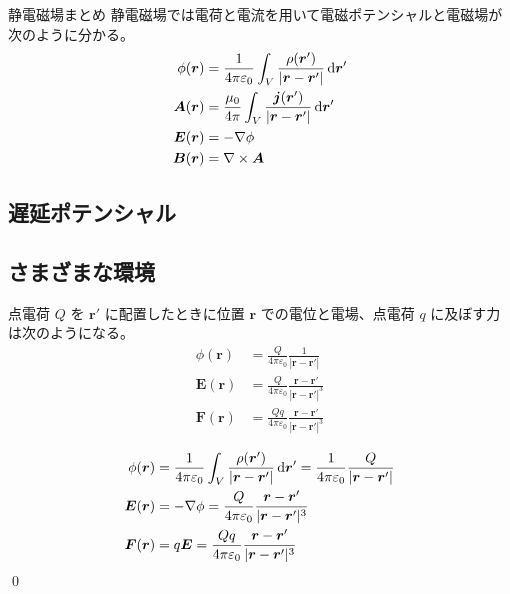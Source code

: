 \documentclass[uplatex,dvipdfmx,a4paper,11pt]{jlreq}
\makeatletter
\newcommand{\EE}{\bm{E}}
\newcommand{\BB}{\bm{B}}
\renewcommand{\AA}{\bm{A}}
\newcommand{\rr}{\bm{r}}
\newcommand{\vnabla}{\mathbf{\nabla}}
\numberwithin{equation}{section}
\theoremstyle{definition}
\renewenvironment{proof}[1][\proofname]{\par
  \normalfont
  \topsep6\p@\@plus6\p@ \trivlist
  \item[\hskip\labelsep{\bfseries #1}\@addpunct{\bfseries}]\ignorespaces\quad\par
}{%
  \qed\endtrivlist\@endpefalse
}
\renewcommand\proofname{証明}
\makeatother
\begin{document}
\begin{itembox}[l]{静電磁場まとめ}
  静電磁場では電荷と電流を用いて電磁ポテンシャルと電磁場が次のように分かる。
  \begin{align}
    \phi(\rr) & = \frac{1}{4\pi\varepsilon_0}\int_V\frac{\rho(\rr')}{|\rr - \rr'|}\dl{\rr'} \\
    \AA(\rr)  & = \frac{\mu_0}{4\pi}\int_V\frac{\bm{j}(\rr')}{|\rr - \rr'|}\dl{\rr'}        \\
    \EE(\rr)  & = -\vnabla\phi                                                              \\
    \BB(\rr)  & = \vnabla\times\AA
  \end{align}
\end{itembox}


\subsection{遅延ポテンシャル}


\subsection{さまざまな環境}
\begin{theorem}[Coulomb 力]
  点電荷 $Q$ を $\rr'$ に配置したときに位置 $\rr$ での電位と電場、点電荷 $q$ に及ぼす力は次のようになる。
  \begin{align}
    \phi(\rr)   & = \frac{Q}{4\pi\varepsilon_0}\frac{1}{|\rr - \rr'|}             \\
    \EE(\rr)    & = \frac{Q}{4\pi\varepsilon_0}\frac{\rr - \rr'}{|\rr - \rr'|^3}  \\
    \bm{F}(\rr) & = \frac{Qq}{4\pi\varepsilon_0}\frac{\rr - \rr'}{|\rr - \rr'|^3}
  \end{align}
\end{theorem}
\begin{proof}
  \begin{align}
    \phi(\rr)   & = \frac{1}{4\pi\varepsilon_0}\int_V\frac{\rho(\rr')}{|\rr - \rr'|}\dl{\rr'} = \frac{1}{4\pi\varepsilon_0}\frac{Q}{|\rr - \rr'|} \\
    \EE(\rr)    & = -\vnabla\phi = \frac{Q}{4\pi\varepsilon_0}\frac{\rr - \rr'}{|\rr - \rr'|^3}                                                   \\
    \bm{F}(\rr) & = q\EE = \frac{Qq}{4\pi\varepsilon_0}\frac{\rr - \rr'}{|\rr - \rr'|^3}
  \end{align}
\end{proof}
\end{document}
